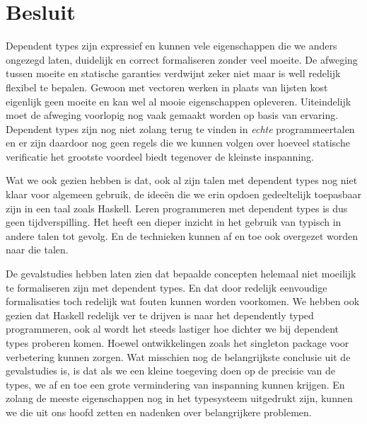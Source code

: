 \chapter{Besluit}
\label{besluit}

Dependent types zijn expressief en kunnen vele eigenschappen die we anders
ongezegd laten, duidelijk en correct formaliseren zonder veel moeite. De
afweging tussen moeite en statische garanties verdwijnt zeker niet maar is well
redelijk flexibel te bepalen. Gewoon met vectoren werken in plaats van lijsten
kost eigenlijk geen moeite en kan wel al mooie eigenschappen opleveren.
Uiteindelijk moet de afweging voorlopig nog vaak gemaakt worden op basis van
ervaring. Dependent types zijn nog niet zolang terug te vinden in \emph{echte}
programmeertalen en er zijn daardoor nog geen regels die we kunnen volgen over
hoeveel statische verificatie het grootste voordeel biedt tegenover de kleinste
inspanning. 

Wat we ook gezien hebben is dat, ook al zijn talen met dependent types nog niet
klaar voor algemeen gebruik, de ideeën die we erin opdoen gedeeltelijk
toepasbaar zijn in een taal zoals Haskell. Leren programmeren met dependent
types is dus geen tijdverspilling. Het heeft een dieper inzicht in het gebruik
van typisch in andere talen tot gevolg. En de technieken kunnen af en toe ook
overgezet worden naar die talen. 

De gevalstudies hebben laten zien dat bepaalde concepten helemaal niet moeilijk
te formaliseren zijn met dependent types. En dat door redelijk eenvoudige
formalisaties toch redelijk wat fouten kunnen worden voorkomen. We hebben ook
gezien dat Haskell redelijk ver te drijven is naar het dependently typed
programmeren, ook al wordt het steeds lastiger hoe dichter we bij dependent
types proberen komen. Hoewel ontwikkelingen zoals het singleton package voor
verbetering kunnen zorgen. Wat misschien nog de belangrijkste conclusie uit de
gevalstudies is, is dat als we een kleine toegeving doen op de precisie van de
types, we af en toe een grote vermindering van inspanning kunnen krijgen. En
zolang de meeste eigenschappen nog in het typesysteem uitgedrukt zijn, kunnen
we die uit ons hoofd zetten en nadenken over belangrijkere problemen.
